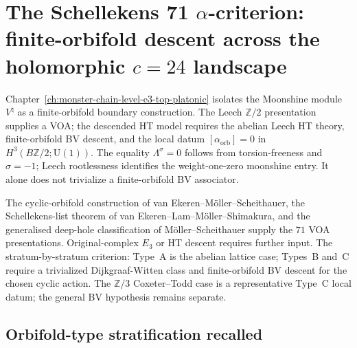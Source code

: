 %

\chapter[Schellekens 71 $\alpha$ criterion]{The Schellekens 71
$\alpha$-criterion: finite-orbifold descent across the holomorphic
$c = 24$ landscape}
\label{ch:schellekens-71-alpha-classification-platonic}

Chapter~\ref*{ch:monster-chain-level-e3-top-platonic} isolates the
Moonshine module $V^\natural$ as a finite-orbifold boundary
construction. The Leech $\mathbb{Z}/2$ presentation supplies a VOA;
the descended HT model requires the abelian Leech HT theory,
finite-orbifold BV descent, and the local datum
$[\alpha_{\mathrm{orb}}]=0$ in
$H^3(B\mathbb{Z}/2;\mathrm{U}(1))$. The equality
$\Lambda^\sigma=0$ follows from torsion-freeness and $\sigma=-1$;
Leech rootlessness identifies the weight-one-zero moonshine entry. It
alone does not trivialize a finite-orbifold BV associator.

The cyclic-orbifold construction of van Ekeren--M\"oller--Scheithauer,
the Schellekens-list theorem of van Ekeren--Lam--M\"oller--Shimakura,
and the generalised deep-hole classification of
M\"oller--Scheithauer supply the $71$ VOA presentations. Original-complex
$E_3$ or HT descent requires further input. The stratum-by-stratum
criterion: Type~A is the abelian lattice case; Types~B and~C require a
trivialized Dijkgraaf-Witten class and finite-orbifold BV descent for the
chosen cyclic action. The $\mathbb{Z}/3$ Coxeter--Todd case is a
representative Type~C local datum; the general BV hypothesis remains
separate.

\section{Orbifold-type stratification recalled}
\label{sec:schellekens-71-stratification-recalled}

